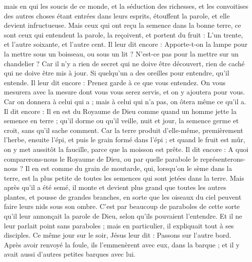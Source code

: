 \begin{multicols}{2}
mais en qui les soucis de ce monde, et la séduction des richesses, et les convoitises des autres choses étant entrées dans leurs esprits, étouffent la parole, et elle devient infructueuse.
Mais ceux qui ont reçu la semence dans la bonne terre, ce sont ceux qui entendent la parole, la reçoivent, et portent du fruit : L'un trente, et l'autre soixante, et l'autre cent{}.
Il leur dit encore : Apporte-t-on la lampe pour la mettre sous un boisseau, ou sous un lit ? N'est-ce pas pour la mettre sur un chandelier ?
Car il n'y a rien de secret qui ne doive être découvert, rien de caché qui ne doive être mis à jour.
Si quelqu'un a des oreilles pour entendre, qu'il entende.
Il leur dit encore : Prenez garde à ce que vous entendez. On vous mesurera avec la mesure dont vous vous serez servis, et on y ajoutera pour vous.
Car on donnera à celui qui a ; mais à celui qui n’a pas, on ôtera même ce qu’il a.
Il dit encore : Il en est du Royaume de Dieu comme quand un homme jette la semence en terre ;
qu’il dorme ou qu’il veille, nuit et jour, la semence germe et croit, sans qu'il sache comment.
Car la terre produit d'elle-même, premièrement l'herbe, ensuite l'épi, et puis le grain formé dans l'épi ;
et quand le fruit est mûr, on y met aussitôt la faucille, parce que la moisson est prête.
Il dit encore : A quoi comparerons-nous le Royaume de Dieu, ou par quelle parabole le représenterons-nous ?
Il en est comme du grain de moutarde, qui, lorsqu'on le sème dans la terre, est la plus petite de toutes les semences qui sont jetées dans la terre.
Mais après qu'il a été semé, il monte et devient plus grand que toutes les autres plantes, et pousse de grandes branches, en sorte que les oiseaux du ciel peuvent faire leurs nids sous son ombre.
C’est par beaucoup de paraboles de cette sorte qu’il leur annonçait la parole de Dieu, selon qu'ils pouvaient l'entendre.
Et il ne leur parlait point sans paraboles ; mais en particulier, il expliquait tout à ses disciples.
Ce même jour sur le soir, Jésus leur dit : Passons sur l’autre bord.
Après avoir renvoyé la foule, ils l'emmenèrent avec eux, dans la barque ; et il y avait aussi d'autres petites barques avec lui.

\end{multicols}
